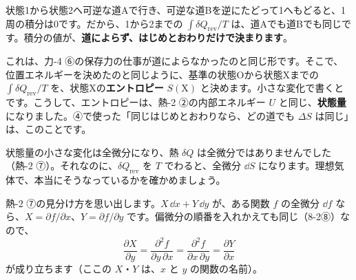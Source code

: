 \noindent\begin{minipage}[c]{0.44\linewidth}\centering
{}
\end{minipage}\hfill
\begin{minipage}[c]{0.53\linewidth}\raggedright
状態1から状態2へ可逆な道Aで行き、可逆な道Bを逆にたどって1へもどると、1周の積分は0です。だから、1から2までの $\int\delta Q_{\mathrm{rev}}/T$ は、道Aでも道Bでも同じです。積分の値が、\textbf{道によらず、はじめとおわりだけで決まります}。
\end{minipage}

\par\vspace{4pt}
これは、力-4 ⑥の保存力の仕事が道によらなかったのと同じ形です。そこで、位置エネルギーを決めたのと同じように、基準の状態Oから状態Xまでの $\int\delta Q_{\mathrm{rev}}/T$ を、状態Xの\textbf{エントロピー} $S(\mathrm X)$ と決めます。小さな変化で書くと
です。こうして、エントロピーは、熱-2 ②の内部エネルギー $U$ と同じ、\textbf{状態量}になりました。④で使った「同じはじめとおわりなら、どの道でも $\Delta S$ は同じ」は、このことです。

状態量の小さな変化は全微分になり、熱 $\delta Q$ は全微分ではありませんでした（熱-2 ⑦）。それなのに、$\delta Q_{\mathrm{rev}}$ を $T$ でわると、全微分 $\dd S$ になります。理想気体で、本当にそうなっているかを確かめましょう。

熱-2 ⑦の見分け方を思い出します。$X\,\dd x+Y\,\dd y$ が、ある関数 $f$ の全微分 $\dd f$ なら、$X=\partial f/\partial x$、$Y=\partial f/\partial y$ です。偏微分の順番を入れかえても同じ（8-2⑧）なので、
\[\frac{\partial X}{\partial y}=\frac{\partial^2f}{\partial y\,\partial x}=\frac{\partial^2f}{\partial x\,\partial y}=\frac{\partial Y}{\partial x}\]
が成り立ちます（ここの $X$・$Y$ は、$x$ と $y$ の関数の名前）。

